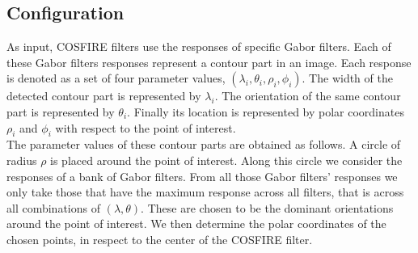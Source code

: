 \subsection{Configuration}
As input, COSFIRE filters use the responses of specific Gabor filters. Each of these Gabor filters responses represent a contour part in an image. Each response is denoted as a set of four parameter values, $( \lambda_{i}, \theta_{i}, \rho_{i}, \phi_{i} )$. The width of the detected contour part is represented by $\lambda_{i}$. The orientation of the same contour part is represented by $\theta_{i}$. Finally its location is represented by polar coordinates $\rho_{i}$ and $\phi_{i}$ with respect to the point of interest.\\

The parameter values of these contour parts are obtained as follows. A circle of radius $\rho$ is placed around the point of interest. Along this circle we consider the responses of a bank of Gabor filters. From all those Gabor filters' responses we only take those that have the maximum response across all filters, that is across all combinations of $(\lambda, \theta)$. These are chosen to be the dominant orientations around the point of interest. We then determine the polar coordinates of the chosen points, in respect to the center of the COSFIRE filter. \\

